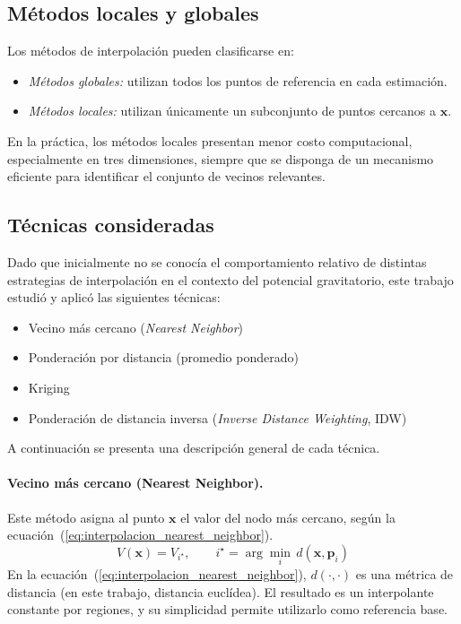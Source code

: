 \documentclass[a4paper,11pt]{book}
\begin{document}
\subsection{Métodos locales y globales}

Los métodos de interpolación pueden clasificarse en:
\begin{itemize}
	\item \emph{Métodos globales:} utilizan todos los puntos de referencia en cada estimación.
	\item \emph{Métodos locales:} utilizan únicamente un subconjunto de puntos cercanos a $\mathbf{x}$.
\end{itemize}

En la práctica, los métodos locales presentan menor costo computacional, especialmente en tres dimensiones, siempre que se disponga de un mecanismo eficiente para identificar el conjunto de vecinos relevantes.

\subsection{Técnicas consideradas}

Dado que inicialmente no se conocía el comportamiento relativo de distintas estrategias de interpolación en el contexto del potencial gravitatorio, este trabajo estudió y aplicó las siguientes técnicas:

\begin{itemize}
	\item Vecino más cercano (\textit{Nearest Neighbor})
	\item Ponderación por distancia (promedio ponderado)
	\item Kriging
	\item Ponderación de distancia inversa (\textit{Inverse Distance Weighting}, IDW)
\end{itemize}

A continuación se presenta una descripción general de cada técnica.

\paragraph{Vecino más cercano (Nearest Neighbor).}
Este método asigna al punto $\mathbf{x}$ el valor del nodo más cercano, según la ecuación~(\ref{eq:interpolacion_nearest_neighbor}).
\begin{equation}
	V(\mathbf{x}) = V_{i^\star}, \qquad i^\star = \arg\min_{i} \, d(\mathbf{x},\mathbf{p}_i)
	\label{eq:interpolacion_nearest_neighbor}
\end{equation}
En la ecuación~(\ref{eq:interpolacion_nearest_neighbor}), $d(\cdot,\cdot)$ es una métrica de distancia (en este trabajo, distancia euclídea). El resultado es un interpolante constante por regiones, y su simplicidad permite utilizarlo como referencia base.
\end{document}

